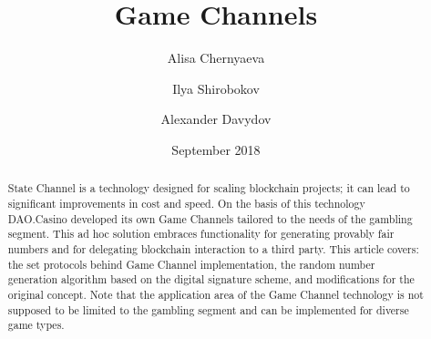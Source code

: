 \documentclass[tikz, 12pt]{article}
\title {Game Channels}
\author {Alisa Chernyaeva}
\author{Ilya Shirobokov}
\author{Alexander Davydov}
\affil{Research department, DAO.Casino Company}
\affil{ \href{mailto:research@dao.casino}{research@dao.casino}}
\date {September 2018}
\theoremstyle{definition}
\theoremstyle{remark}
\begin{document}
\maketitle
	\begin{abstract}
State Channel is a technology designed for scaling blockchain projects; it can lead to significant improvements in cost and speed. On the basis of this technology DAO.Casino developed its own Game Channels tailored to the needs of the gambling segment. This ad hoc solution embraces functionality for generating provably fair numbers and for delegating blockchain interaction to a third party. This article covers: the set protocols behind Game Channel implementation, the random number generation algorithm based on the digital signature scheme, and modifications for the original concept. Note that the application area of the Game Channel technology is not supposed to be limited to the gambling segment and can be implemented for diverse game types.

	\end{abstract}
\tableofcontents	
	
	
		
\end{document}
